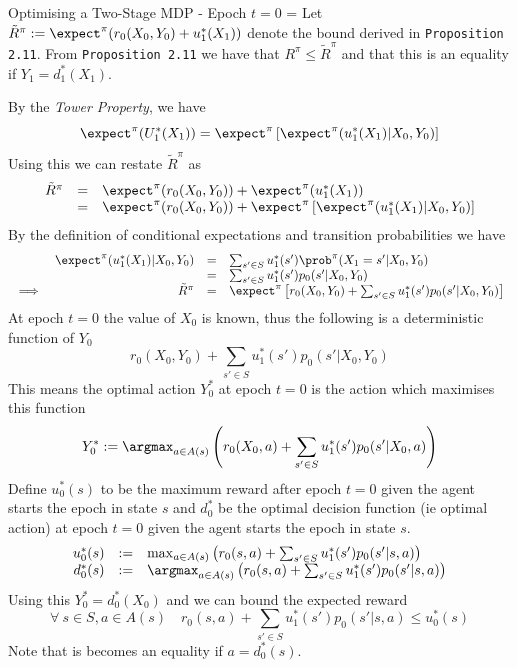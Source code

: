 \documentclass[11pt,a4paper]{article}
\begin{document}
  \begin{proposition}{Optimising a Two-Stage MDP - Epoch $t=0$}
    \everymath={\displaystyle}
    Let $\tilde{R}^\pi:=\expect^\pi(r_0(X_0,Y_0)+u_1^*(X_1))$ denote the bound derived in \texttt{Proposition 2.11}. From \texttt{Proposition 2.11} we have that $R^\pi\leq \tilde{R}^\pi$ and that this is an equality if $Y_1=d_1^*(X_1)$.
    \par By the \textit{Tower Property}, we have
    \[ \expect^\pi(U_1^*(X_1))=\expect^\pi\left[\expect^\pi(u_1^*(X_1)|X_0,Y_0)\right] \]
    Using this we can restate $\tilde{R}^\pi$ as
    \[\begin{array}{rcl}
      \tilde{R}^\pi&=&\expect^\pi(r_0(X_0,Y_0))+\expect^\pi(u_1^*(X_1))\\
      &=&\expect^\pi(r_0(X_0,Y_0))+\expect^\pi\left[\expect^\pi(u_1^*(X_1)|X_0,Y_0)\right]
    \end{array}\]
    By the definition of conditional expectations and transition probabilities we have
    \[\begin{array}{rrcl}
      &\expect^\pi(u_1^*(X_1)|X_0,Y_0)&=&\sum_{s'\in S}u_1^*(s')\prob^\pi(X_1=s'|X_0,Y_0)\\
      &&=&\sum_{s'\in S}u_1^*(s')p_0(s'|X_0,Y_0)\\
      \implies&\tilde{R}^\pi&=&\expect^\pi\left[r_0(X_0,Y_0)+\sum_{s'\in S}u_1^*(s')p_0(s'|X_0,Y_0)\right]
    \end{array}\]
    At epoch $t=0$ the value of $X_0$ is known, thus the following is a deterministic function of $Y_0$
    \[ r_0(X_0,Y_0)+\sum_{s'\in S}u_1^*(s')p_0(s'|X_0,Y_0) \]
    This means the optimal action $Y_0^*$ at epoch $t=0$ is the action which maximises this function
    \[ Y_0^*:=\argmax_{a\in A(s)}\left(r_0(X_0,a)+\sum_{s'\in S}u_1^*(s')p_0(s'|X_0,a)\right) \]
    Define $u_0^*(s)$ to be the maximum reward after epoch $t=0$ given the agent starts the epoch in state $s$ and $d_0^*$ be the optimal decision function (ie optimal action) at epoch $t=0$ given the agent starts the epoch in state $s$.
    \[\begin{array}{rcl}
      u_0^*(s)&:=&\max_{a\in A(s)}\left(r_0(s,a)+\sum_{s'\in S}u_1^*(s')p_0(s'|s,a)\right)\\
      d_0^*(s)&:=&\argmax_{a\in A(s)}\left(r_0(s,a)+\sum_{s'\in S}u_1^*(s')p_0(s'|s,a)\right)
    \end{array}\]
    Using this $Y_0^*=d_0^*(X_0)$ and we can bound the expected reward
    \[ \forall\ s\in S,a\in A(s)\quad r_0(s,a)+\sum_{s'\in S}u_1^*(s')p_0(s'|s,a)\leq u_0^*(s) \]
    Note that is becomes an equality if $a=d_0^*(s)$.

\end{proposition}
\end{document}
